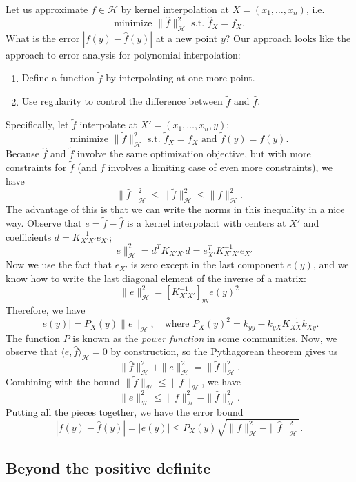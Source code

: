 \documentclass[12pt, leqno]{article} %
\begin{document}
Let us approximate $f \in \mathcal{H}$ by kernel interpolation
at $X = (x_1, \ldots, x_n)$, i.e.
\[
  \mbox{minimize } \|\hat{f}\|_{\mathcal{H}}^2
  \mbox{ s.t.~} \hat{f}_X = f_X.
\]
What is the error $|f(y)-\hat{f}(y)|$ at a new point $y$?
Our approach looks like the approach to error analysis for polynomial
interpolation:
\begin{enumerate}
\item Define a function $\tilde{f}$ by interpolating at one more point.
\item Use regularity to control the difference between $\tilde{f}$ and $\hat{f}$.
\end{enumerate}
Specifically, let $\tilde{f}$ interpolate at $X' = (x_1, \ldots, x_n, y)$:
\[
  \mbox{minimize } \|\tilde{f}\|_{\mathcal{H}}^2
  \mbox{ s.t.~} \tilde{f}_X = f_X \mbox{ and } \tilde{f}(y) = f(y).
\]
Because $\hat{f}$ and $\tilde{f}$ involve the same optimization
objective, but with more constraints for $\tilde{f}$ (and $f$ involves
a limiting case of even more constraints), we have
\[
  \|\hat{f}\|_{\mathcal{H}}^2 \leq
  \|\tilde{f}\|_{\mathcal{H}}^2 \leq
  \|f\|_{\mathcal{H}}^2.
\]
The advantage of this is that we can write the norms in this
inequality in a nice way.  Observe that $e = \tilde{f}-\hat{f}$ is a
kernel interpolant with centers at $X'$ and coefficients
$d = K_{X'X'}^{-1} e_{X'}$; 
\[
  \|e\|_{\mathcal{H}}^2
    = d^T K_{X'X'} d = e_{X'}^T K_{X'X'}^{-1} e_{X'}
\]
Now we use the fact that $e_{X'}$ is zero except in the last component
$e(y)$, and we know how to write the last diagonal element of the
inverse of a matrix:
\[
  \|e\|_{\mathcal{H}}^2 = [K_{X'X'}^{-1}]_{yy} e(y)^2
\]
Therefore, we have
\[
  |e(y)| = P_X(y) \|e\|_{\mathcal{H}}, \quad
  \mbox{where } P_X(y)^2 = k_{yy} - k_{yX} K_{XX}^{-1} k_{Xy}.
\]
The function $P$ is known as the {\em power function} in some
communities.  Now, we observe that
$\langle e, \hat{f} \rangle_{\mathcal{H}} = 0$ by construction,
so the Pythagorean theorem gives us
\[
  \|\hat{f}\|_{\mathcal{H}}^2 + \|e\|_{\mathcal{H}}^2 =
  \|\tilde{f}\|_{\mathcal{H}}^2.
\]
Combining with the bound $\|\tilde{f}\|_{\mathcal{H}} \leq \|f\|_{\mathcal{H}}$,
we have
\[
  \|e\|_{\mathcal{H}}^2 \leq \|f\|_{\mathcal{H}}^2 - \|\hat{f}\|_{\mathcal{H}}^2.
\]
Putting all the pieces together, we have the error bound
\[
  |f(y)-\hat{f}(y)| = |e(y)| \leq
    P_X(y) \sqrt{\|f\|_{\mathcal{H}}^2 - \|\hat{f}\|_{\mathcal{H}}^2}.
\]

\subsection{Beyond the positive definite}
\end{document}
